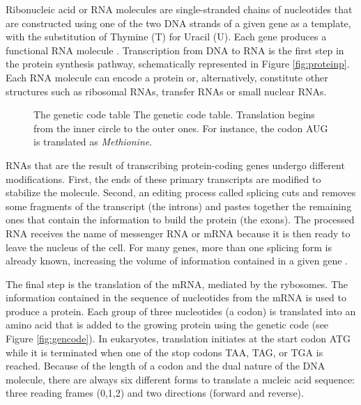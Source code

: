 
Ribonucleic acid or RNA molecules are single-stranded chains of nucleotides 
%  
that are constructed 
using one of the two DNA strands of a given gene as a template, with the substitution of Thymine (T) 
for Uracil (U). Each gene produces a functional RNA molecule \citep{alberts:1994a}. Transcription
%   
from DNA to RNA is the first step in the protein synthesis pathway, schematically represented in 
Figure \ref{fig:proteinp}. 
%   
Each RNA molecule can encode a protein or, alternatively, constitute other 
structures such as ribosomal RNAs, transfer RNAs or small nuclear RNAs.
%   

\begin{figure}[t!]
\begin{center}
\setlength{\fboxsep}{0pt}
          {The genetic code table}%
          {The genetic code table.}%
          {Translation begins from the inner circle to the outer ones. For instance, the codon AUG is translated as \emph{Methionine}.}%
\end{center}
\end{figure}

RNAs that are the result of transcribing protein-coding genes undergo different modifications.
First, the ends of these primary transcripts are modified to stabilize the molecule. Second, an 
editing process called splicing 
%      
cuts and removes some fragments of the transcript (the introns)
and pastes together the remaining ones that contain the information to build the protein (the exons).
The processed RNA receives the name of messenger RNA or mRNA
 because it is then ready to leave the 
nucleus of the cell. For many genes, more than one splicing form is already known, increasing
the volume of information contained in a given gene \citep{alberts:1994a}.

The final step is the translation
 of the mRNA, mediated by the rybosomes. The 
information contained in the sequence of nucleotides from the mRNA is used to produce a protein.
Each group of three nucleotides (a codon)
 is translated into an amino acid that is added to the 
growing protein using the genetic code
 (see Figure \ref{fig:gencode}). In eukaryotes, translation 
initiates at the start codon ATG while it is terminated when one of the stop codons TAA, TAG, or TGA is 
reached. Because of the length of a codon and the dual nature of the DNA molecule, there are 
always six different forms to translate a nucleic acid sequence: three reading frames (0,1,2)
 and two directions (forward and reverse).

